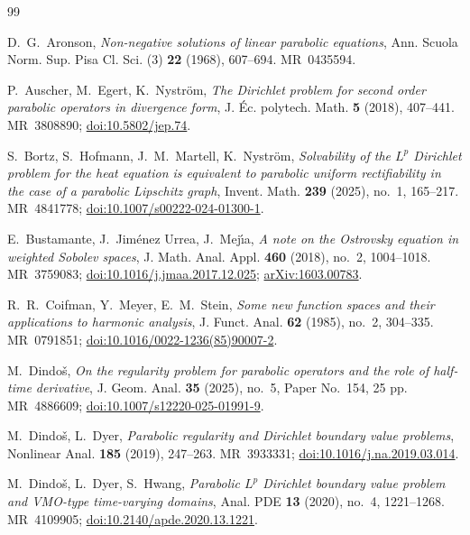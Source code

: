 \documentclass[12pt,leqno]{amsart}
\numberwithin{equation}{section}
\theoremstyle{plain}
\theoremstyle{remark}
\begin{document}
\begin{thebibliography}{99}

 D.~G.~Aronson, \emph{Non-negative solutions of linear parabolic
equations}, Ann. Scuola Norm. Sup. Pisa Cl. Sci. (3) \textbf{22} (1968),
607--694. MR~0435594.

 P.~Auscher, M.~Egert, K.~Nystr\"om, \emph{The Dirichlet problem
for second order parabolic operators in divergence form}, J. \'Ec. polytech.
Math. \textbf{5} (2018), 407--441. MR~3808890;
\href{https://doi.org/10.5802/jep.74}{doi:10.5802/jep.74}.

 S.~Bortz, S.~Hofmann, J.~M.~Martell, K.~Nystr\"om,
\emph{Solvability of the $L^{p}$ Dirichlet problem for the heat equation is
equivalent to parabolic uniform rectifiability in the case of a parabolic
Lipschitz graph}, Invent. Math. \textbf{239} (2025), no.~1, 165--217.
MR~4841778;
\href{https://doi.org/10.1007/s00222-024-01300-1}{doi:10.1007/s00222-024-01300-1}.

 E.~Bustamante, J.~Jim\'enez Urrea, J.~Mej\'{\i}a,
\emph{A note on the Ostrovsky equation in weighted Sobolev spaces},
J. Math. Anal. Appl. \textbf{460} (2018), no.~2, 1004--1018.
MR~3759083;
\href{https://doi.org/10.1016/j.jmaa.2017.12.025}{doi:10.1016/j.jmaa.2017.12.025};
\href{https://arxiv.org/abs/1603.00783}{arXiv:1603.00783}.

 R.~R.~Coifman, Y.~Meyer, E.~M.~Stein,
\emph{Some new function spaces and their applications to harmonic analysis},
J. Funct. Anal. \textbf{62} (1985), no.~2, 304--335. MR~0791851;
\href{https://doi.org/10.1016/0022-1236(85)90007-2}{doi:10.1016/0022-1236(85)90007-2}.

 M.~Dindo\v s, \emph{On the regularity problem for parabolic
operators and the role of half-time derivative}, J. Geom. Anal. \textbf{35}
(2025), no.~5, Paper No.~154, 25 pp. MR~4886609;
\href{https://doi.org/10.1007/s12220-025-01991-9}{doi:10.1007/s12220-025-01991-9}.

 M.~Dindo\v s, L.~Dyer, \emph{Parabolic regularity and Dirichlet
boundary value problems}, Nonlinear Anal. \textbf{185} (2019), 247--263.
MR~3933331;
\href{https://doi.org/10.1016/j.na.2019.03.014}{doi:10.1016/j.na.2019.03.014}.

 M.~Dindo\v s, L.~Dyer, S.~Hwang, \emph{Parabolic $L^p$
  Dirichlet boundary value problem and VMO-type time-varying domains},
  Anal. PDE \textbf{13} (2020), no.~4, 1221--1268. MR~4109905;
  \href{https://doi.org/10.2140/apde.2020.13.1221}{doi:10.2140/apde.2020.13.1221}.


\end{thebibliography}
\end{document}
